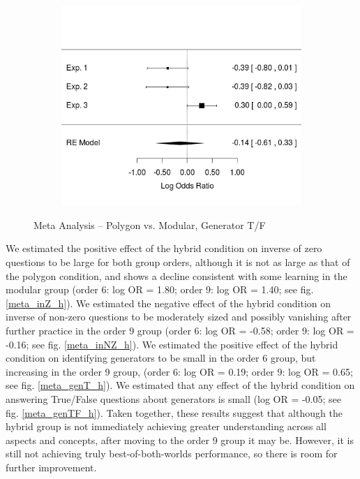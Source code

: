 \documentclass[11pt]{article}
\begin{document}
\begin{figure}[H]
\centering
\begin{subfigure}[c]{0.4\textwidth}
\centering
\includegraphics[width=\textwidth]{figures/meta/p_gen_TF_n.png}
\end{subfigure}
\caption{Meta Analysis -- Polygon vs. Modular, Generator T/F}
\label{meta_genTF_p}
\end{figure}\noindent 
We estimated the positive effect of the hybrid condition on inverse of zero questions to be large for both group orders, although it is not as large as that of the polygon condition, and shows a decline consistent with some learning in the modular group (order 6: log OR = 1.80; order 9: log OR = 1.40; see fig. \ref{meta_inZ_h}). We estimated the negative effect of the hybrid condition on inverse of non-zero questions to be moderately sized and possibly vanishing after further practice in the order 9 group (order 6: log OR = -0.58; order 9: log OR = -0.16; see fig. \ref{meta_inNZ_h}). We estimated the positive effect of the hybrid condition on identifying generators to be small in the order 6 group, but increasing in the order 9 group, (order 6: log OR = 0.19; order 9: log OR = 0.65; see fig. \ref{meta_genT_h}). We estimated that any effect of the hybrid condition on answering True/False questions about generators is small (log OR = -0.05; see fig. \ref{meta_genTF_h}). Taken together, these results suggest that although the hybrid group is not immediately achieving greater understanding across all aspects and concepts, after moving to the order 9 group it may be. However, it is still not achieving truly best-of-both-worlds performance, so there is room for further improvement. 
\end{document}
